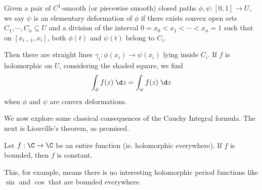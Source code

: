 \documentclass[a4paper]{article}
\begin{document}
\begin{defi}
  Given a pair of $C^1$-smooth (or piecewise smooth) closed paths $\phi, \psi: [0, 1] \to U$, we say $\psi$ is an elementary deformation of $\phi$ if there exists convex open sets $C_1, \cdots, C_n \subseteq U$ and a division of the interval $0 = x_0 < x_1 < \cdots < x_n = 1$ such that on $[x_{i - 1}, x_i]$, both $\phi(t)$ and $\psi(t)$ belong to $C_i$.
\end{defi}
\begin{center}
\end{center}
Then there are straight lines $\gamma_i: \phi(x_i) \to \psi(x_i)$ lying inside $C_i$. If $f$ is holomorphic on $U$, considering the shaded square, we find
\[
  \int_\phi f(z)\;\d z = \int_\psi f(z)\;\d z
\]
when $\phi$ and $\psi$ are convex deformations.

We now explore some classical consequences of the Cauchy Integral formula. The next is Liouville's theorem, as promised.
\begin{thm}
  Let $f: \C \to \C$ be an entire function (ie. holomorphic everywhere). If $f$ is bounded, then $f$ is constant.
\end{thm}
This, for example, means there is no interesting holomorphic period functions like $\sin$ and $\cos$ that are bounded everywhere.
\end{document}
